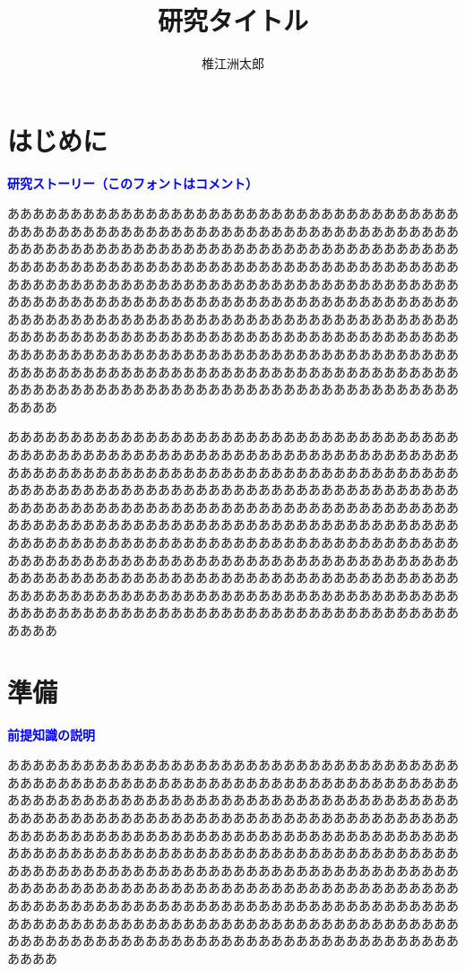 \documentclass[dvipdfmx]{cs-handout}
\title{研究タイトル}
\author{椎江洲太郎}
\newcommand{\Note}[1]{\noindent \textbf{\textcolor{blue}{#1}}}
\begin{document}
\maketitle

\section{はじめに}
\Note{研究ストーリー（このフォントはコメント）}

ああああああああああああああああああああああああああああああああああああ
ああああああああああああああああああああああああああああああああああああ
ああああああああああああああああああああああああああああああああああああ
ああああああああああああああああああああああああああああああああああああ
ああああああああああああああああああああああああああああああああああああ
ああああああああああああああああああああああああああああああああああああ
ああああああああああああああああああああああああああああああああああああ
ああああああああああああああああああああああああああああああああああああ
ああああああああああああああああああああああああああああああああああああ
ああああああああああああああああああああああああああああああああああああ
ああああああああああああああああああああああああああああああああああああ
ああああ

ああああああああああああああああああああああああああああああああああああ
ああああああああああああああああああああああああああああああああああああ
ああああああああああああああああああああああああああああああああああああ
ああああああああああああああああああああああああああああああああああああ
ああああああああああああああああああああああああああああああああああああ
ああああああああああああああああああああああああああああああああああああ
ああああああああああああああああああああああああああああああああああああ
ああああああああああああああああああああああああああああああああああああ
ああああああああああああああああああああああああああああああああああああ
ああああああああああああああああああああああああああああああああああああ
ああああああああああああああああああああああああああああああああああああ
ああああ

\section{準備}
\Note{前提知識の説明}

ああああああああああああああああああああああああああああああああああああ
ああああああああああああああああああああああああああああああああああああ
ああああああああああああああああああああああああああああああああああああ
ああああああああああああああああああああああああああああああああああああ
ああああああああああああああああああああああああああああああああああああ
ああああああああああああああああああああああああああああああああああああ
ああああああああああああああああああああああああああああああああああああ
ああああああああああああああああああああああああああああああああああああ
ああああああああああああああああああああああああああああああああああああ
ああああああああああああああああああああああああああああああああああああ
ああああああああああああああああああああああああああああああああああああ
ああああ
\end{document}

